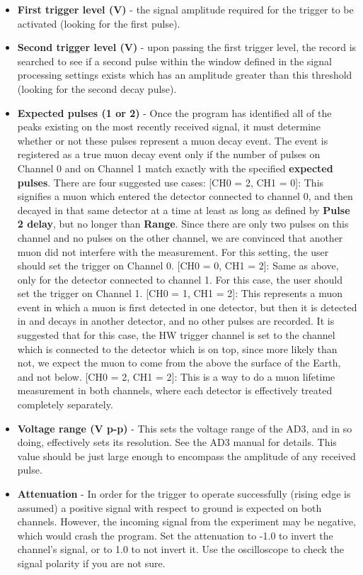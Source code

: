 \documentclass{../lab}
\begin{document}
\begin{itemize}
    \item \textbf{First trigger level (V)} - the signal amplitude required for the trigger to be activated (looking for the first pulse).
    \item \textbf{Second trigger level (V) }- upon passing the first trigger level, the record is searched to see if a second pulse within the window defined in the signal processing settings exists which has an amplitude greater than this threshold (looking for the second decay pulse).
    \item \textbf{Expected pulses (1 or 2)} - Once the program has identified all of the peaks existing on the most recently received signal, it must determine whether or not these pulses represent a muon decay event. The event is registered as a true muon decay event only if the number of pulses on Channel 0 and on Channel 1 match exactly with the specified \textbf{expected pulses}. 
    There are four suggested use cases: [CH0 = 2, CH1 = 0]: This signifies a muon which entered the detector connected to channel 0, and then decayed in that same detector at a time at least as long as defined by \textbf{Pulse 2 delay}, but no longer than \textbf{Range}. Since there are only two pulses on this channel and no pulses on the other channel, we are convinced that another muon did not interfere with the measurement. For this setting, the user should set the trigger on Channel 0. [CH0 = 0, CH1 = 2]: Same as above, only for the detector connected to channel 1. For this case, the user should set the trigger on Channel 1. [CH0 = 1, CH1 = 2]: This represents a muon event in which a muon is first detected in one detector, but then it is detected in and decays in another detector, and no other pulses are recorded. It is suggested that for this case, the HW trigger channel is set to the channel which is connected to the detector which is on top, since more likely than not, we expect the muon to come from the above the surface of the Earth, and not below. [CH0 = 2, CH1 = 2]: This is a way to do a muon lifetime measurement in both channels, where each detector is effectively treated completely separately.
    \item \textbf{Voltage range (V p-p)} - This sets the voltage range of the AD3, and in so doing, effectively sets its resolution. See the AD3 manual for details. This value should be just large enough to encompass the amplitude of any received pulse.
    \item \textbf{Attenuation} - In order for the trigger to operate successfully (rising edge is assumed) a positive signal with respect to ground is expected on both channels. However, the incoming signal from the experiment may be negative, which would crash the program. Set the attenuation to -1.0 to invert the channel's signal, or to 1.0 to not invert it. Use the oscilloscope to check the signal polarity if you are not sure.
\end{itemize}
\end{document}
